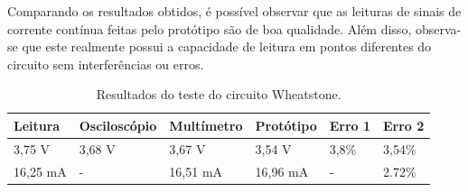 Comparando os resultados obtidos, é possível observar que as leituras de sinais de corrente contínua feitas pelo protótipo são de boa qualidade. Além disso, observa-se que este realmente possui a capacidade de leitura em pontos diferentes do circuito sem interferências ou erros.

\begin{table}[!ht]
    \centering
    \caption{Resultados do teste do circuito Wheatstone.}
    \label{tab:resultados-wheatstone}
    \begin{tabular}{|l|l|l|l|l|l|}
        \hline
        \textbf{Leitura} & \textbf{Osciloscópio} & \textbf{Multímetro} & \textbf{Protótipo}    & \textbf{Erro 1}  & \textbf{Erro 2}   \\ \hline
        3,75 V           & 3,68 V                & 3,67 V              & 3,54 V                & 3,8\%            & 3,54\%            \\ \hline
        16,25 mA         & -                     & 16,51 mA            & 16,96 mA              & -                & 2.72\%            \\ \hline
    \end{tabular}
    \fonte{}
\end{table}